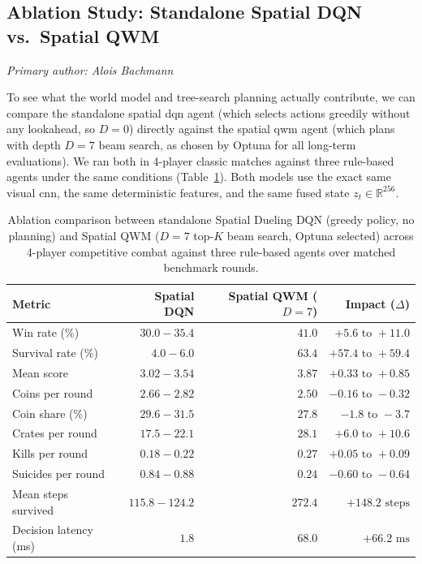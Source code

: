 \documentclass[article, 10pt]{IEEEtran}
\begin{document}

\subsection{Ablation Study: Standalone Spatial DQN vs.\ Spatial QWM}\label{subsec:spatial_dqn_ablation}

\textit{Primary author: Alois Bachmann}

To see what the world model and tree-search planning actually contribute, we can compare the standalone spatial dqn agent (which selects actions greedily without any lookahead, so $D=0$) directly against the spatial qwm agent (which plans with depth $D=7$ beam search, as chosen by Optuna for all long-term evaluations). We ran both in 4-player classic matches against three rule-based agents under the same conditions (Table~\ref{tab:dqn_vs_qwm_ablation}). Both models use the exact same visual cnn, the same deterministic features, and the same fused state $z_t \in \mathbb{R}^{256}$.

\begin{table}[t]
  \centering
  \small
  \caption{Ablation comparison between standalone Spatial Dueling DQN (greedy policy, no planning) and Spatial QWM ($D=7$ top-$K$ beam search, Optuna selected) across 4-player competitive combat against three rule-based agents over matched benchmark rounds.}
  \label{tab:dqn_vs_qwm_ablation}
  \begin{tabular}{lrrr}
    \toprule
    Metric & Spatial DQN & Spatial QWM ($D=7$) & Impact ($\Delta$) \\
    \midrule
    Win rate (\%)           & $30.0 - 35.4$ & $41.0$ & $+5.6\text{ to }+11.0$ \\
    Survival rate (\%)      & $4.0 - 6.0$   & $63.4$ & $+57.4\text{ to }+59.4$ \\
    Mean score              & $3.02 - 3.54$ & $3.87$ & $+0.33\text{ to }+0.85$ \\
    Coins per round         & $2.66 - 2.82$ & $2.50$ & $-0.16\text{ to }-0.32$ \\
    Coin share (\%)         & $29.6 - 31.5$ & $27.8$ & $-1.8\text{ to }-3.7$ \\
    Crates per round        & $17.5 - 22.1$ & $28.1$ & $+6.0\text{ to }+10.6$ \\
    Kills per round         & $0.18 - 0.22$ & $0.27$ & $+0.05\text{ to }+0.09$ \\
    Suicides per round      & $0.84 - 0.88$ & $0.24$ & $-0.60\text{ to }-0.64$ \\
    Mean steps survived     & $115.8 - 124.2$ & $272.4$ & $+148.2\text{ steps}$ \\
    Decision latency (ms)   & $1.8$         & $68.0$ & $+66.2\text{ ms}$ \\
    \bottomrule
  \end{tabular}
\end{table}
\end{document}
